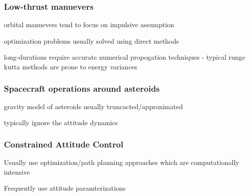 

\begin{frame}[t]\frametitle{Low-thrust manuevers}
    
    orbital manuevers tend to focus on impulsive assumption

    optimization problems usually solved using direct methods

    long-durations require accurate numerical propogation techniques - typical runge kutta methods are prone to energy variances

\end{frame}


\begin{frame}[t]\frametitle{Spacecraft operations around asteroids}
    gravity model of asteroids usually truncacted/approximated

    typically ignore the attitude dynamics


\end{frame}

\begin{frame}[t]\frametitle{Constrained Attitude Control}
    
Usually use optimization/path planning approaches which are computationally intensive

Frequently use attitude paramterizations

\end{frame}